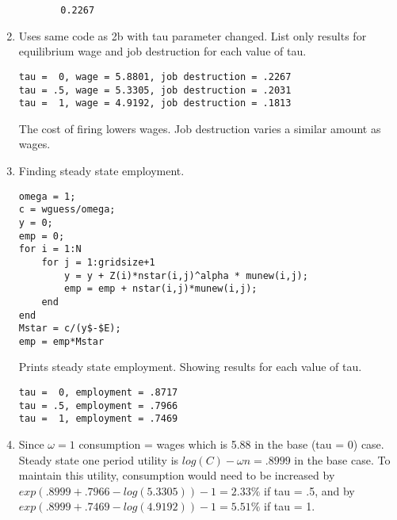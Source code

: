 \documentclass[12pt]{article}
\begin{document}
\begin{onehalfspace}
\begin{enumerate}[1.]
\begin{enumerate}
\begin{lstlisting}
    0.2267 
\end{lstlisting}
    \end{enumerate}
    
    
    \item Uses same code as 2b with tau parameter changed. List only results for equilibrium wage and job destruction for each value of tau.
\begin{lstlisting}
tau =  0, wage = 5.8801, job destruction = .2267
tau = .5, wage = 5.3305, job destruction = .2031
tau =  1, wage = 4.9192, job destruction = .1813
\end{lstlisting}
 
The cost of firing lowers wages. Job destruction varies a similar amount as wages.
    \item
    Finding steady state employment.
\begin{lstlisting}
omega = 1;
c = wguess/omega;
y = 0;
emp = 0;
for i = 1:N
    for j = 1:gridsize+1
        y = y + Z(i)*nstar(i,j)^alpha * munew(i,j);
        emp = emp + nstar(i,j)*munew(i,j);
    end
end
Mstar = c/(y$-$E);
emp = emp*Mstar
\end{lstlisting}
Prints steady state employment. Showing results for each value of tau.
\begin{lstlisting}
tau =  0, employment = .8717
tau = .5, employment = .7966
tau =  1, employment = .7469
\end{lstlisting}
    \item
    Since $\omega=1$ consumption = wages which is 5.88 in the base (tau = 0) case. Steady state one period utility is $log(C) - \omega n = .8999$  in the base case. To maintain this utility, consumption would need to be increased by $exp\left(.8999+.7966 - log(5.3305)\right)-1 = 2.33\%$ if tau = .5, and by $exp\left(.8999+.7469 - log(4.9192)\right)-1 = 5.51\%$ if tau = 1.
\end{enumerate}

\end{onehalfspace}
\end{document}
